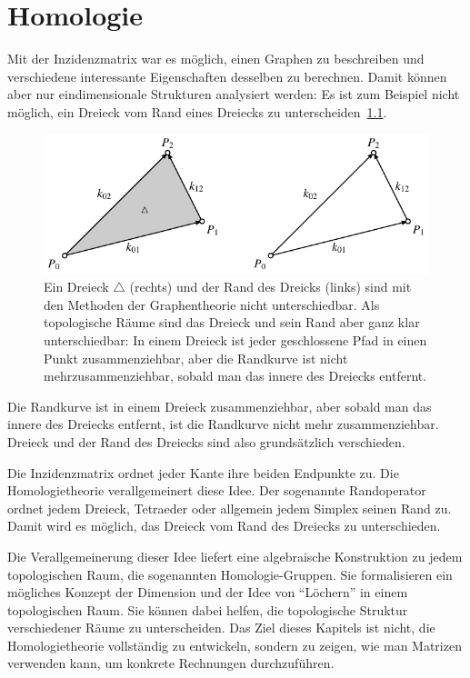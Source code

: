 %
%
%
\chapter{Homologie
\label{buch:chapter:homologie}}
\rhead{}
Mit der Inzidenzmatrix war es möglich, einen Graphen zu beschreiben
und verschiedene interessante Eigenschaften desselben zu berechnen.
Damit können aber nur eindimensionale Strukturen analysiert werden:
Es ist zum Beispiel nicht möglich, ein Dreieck vom Rand eines
Dreiecks zu unterscheiden~\ref{buch:homologie:figure:zusammenziehbar}.
\begin{figure}
\centering
\includegraphics{chapters/95-homologie/images/dreieck.pdf}
\caption{Ein Dreieck $\triangle$ (rechts) und der Rand des Dreicks
(links) sind mit den Methoden
der Graphentheorie nicht unterschiedbar. 
Als topologische Räume sind das Dreieck und sein Rand aber ganz klar
unterschiedbar: In einem Dreieck ist jeder geschlossene Pfad in einen 
Punkt zusammenziehbar, aber die Randkurve ist nicht mehrzusammenziehbar,
sobald man das innere des Dreiecks entfernt.
\label{buch:homologie:figure:zusammenziehbar}}
\end{figure}
Die Randkurve ist in einem Dreieck zusammenziehbar, aber sobald man
das innere des Dreiecks entfernt, ist die Randkurve nicht mehr
zusammenziehbar.
Dreieck und der Rand des Dreiecks sind also grundsätzlich verschieden.

Die Inzidenzmatrix ordnet jeder Kante ihre beiden Endpunkte zu.
Die Homologietheorie verallgemeinert diese Idee.
Der sogenannte Randoperator ordnet jedem Dreieck, Tetraeder oder allgemein
jedem Simplex seinen Rand zu.
Damit wird es möglich, das Dreieck vom Rand des Dreiecks zu unterschieden.

Die Verallgemeinerung dieser Idee liefert eine algebraische Konstruktion
zu jedem topologischen Raum, die sogenannten Homologie-Gruppen.
Sie formalisieren ein mögliches Konzept der Dimension und der
Idee von ``Löchern'' in einem topologischen Raum.
Sie können dabei helfen, die topologische Struktur verschiedener
Räume zu unterscheiden.
Das Ziel dieses Kapitels ist nicht, die Homologietheorie 
vollständig zu entwickeln, sondern zu zeigen, wie man Matrizen
verwenden kann, um konkrete Rechnungen durchzuführen.




%








